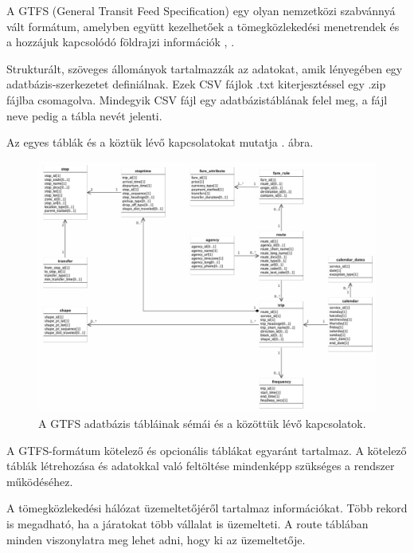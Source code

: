 
A GTFS (General Transit Feed Specification) egy olyan nemzetközi szabvánnyá vált formátum, amelyben együtt kezelhetőek a tömegközlekedési menetrendek és a hozzájuk kapcsolódó földrajzi információk \cite{gtfs}, \cite{gtfsspec}.

Strukturált, szöveges állományok tartalmazzák az adatokat, amik lényegében egy adatbázis-szerkezetet definiálnak. Ezek CSV fájlok .txt kiterjesztéssel egy .zip fájlba csomagolva. Mindegyik CSV fájl egy adatbázistáblának felel meg, a fájl neve pedig a tábla nevét jelenti.

Az egyes táblák és a köztük lévő kapcsolatokat mutatja . ábra.

\begin{figure}[htb]
\centering
\includegraphics[scale=0.3]{kepek/gtfs_relationships.png}
\caption{A GTFS adatbázis tábláinak sémái és a közöttük lévő kapcsolatok.}
\label{fig:gtfs}
\end{figure}

A GTFS-formátum kötelező és opcionális táblákat egyaránt tartalmaz. A kötelező táblák létrehozása és adatokkal való feltöltése mindenképp szükséges a rendszer működéséhez.



A tömegközlekedési hálózat üzemeltetőjéről tartalmaz információkat. Több rekord is megadható, ha a járatokat több vállalat is üzemelteti. A route táblában minden viszonylatra meg lehet adni, hogy ki az üzemeltetője.

